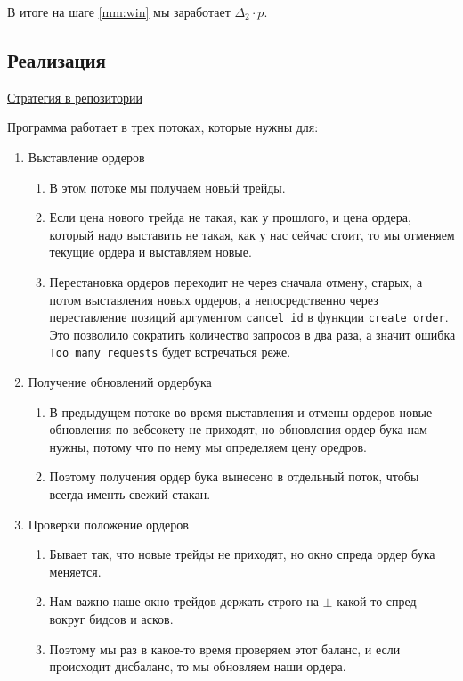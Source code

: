 В итоге на шаге \ref{mm:win} мы заработает $\Delta_2 \cdot p$.

\subsection{Реализация}
\hyperlink{https://github.com/dexety/dex-trading-system/tree/main/research/lp-0003-market-making}{Стратегия в репозитории}

Программа работает в трех потоках, которые нужны для: 

\begin{enumerate}

\item Выставление ордеров
\begin{enumerate}
    \item В этом потоке мы получаем новый трейды.
    \item Если цена нового трейда не такая, как у прошлого, и цена ордера, который надо выставить не такая, как у нас сейчас стоит, то мы отменяем текущие ордера и выставляем новые.
    \item Перестановка ордеров переходит не через сначала отмену, старых, а потом выставления новых ордеров, а непосредственно через переставление позиций аргументом \texttt{cancel\_id} в функции \texttt{create\_order}. Это позволило сократить количество запросов в два раза, а значит ошибка \texttt{Too many requests} будет встречаться реже.
\end{enumerate}

\item Получение обновлений ордербука
\begin{enumerate}
    \item В предыдущем потоке во время выставления и отмены ордеров новые обновления по вебсокету не приходят, но обновления ордер бука нам нужны, потому что по нему мы определяем цену оредров.
    \item Поэтому получения ордер бука вынесено в отдельный поток, чтобы всегда именть свежий стакан.
\end{enumerate}

\item Проверки положение ордеров
\begin{enumerate}
    \item Бывает так, что новые трейды не приходят, но окно спреда ордер бука меняется.
    \item Нам важно наше окно трейдов держать строго на $\pm$ какой-то спред вокруг бидсов и асков.
    \item Поэтому мы раз в какое-то время проверяем этот баланс, и если происходит дисбаланс, то мы обновляем наши ордера.
\end{enumerate}

\end{enumerate}


